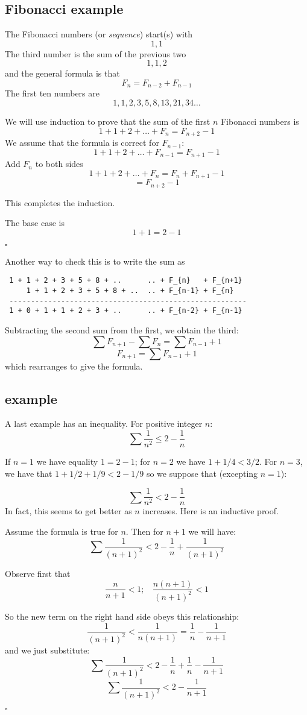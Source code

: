 \documentclass[11pt, oneside]{article}
\begin{document}
\subsection*{Fibonacci example}

The Fibonacci numbers (or \emph{sequence}) start(s) with
\[ 1, 1 \]
The third number is the sum of the previous two
\[ 1, 1, 2 \]
and the general formula is that
\[ F_n = F_{n-2} + F_{n-1} \]
The first ten numbers are
\[ 1, 1, 2, 3, 5, 8, 13, 21, 34 \dots \]

We will use induction to prove that the sum of the first $n$ Fibonacci numbers is
\[ 1 + 1 + 2 + \dots + F_n = F_{n+2} - 1 \]
We assume that the formula is correct for $F_{n - 1}$:
\[ 1 + 1 + 2 + \dots + F_{n-1} = F_{n+1} - 1 \]
Add $F_{n}$ to both sides
\[ 1 + 1 + 2 + \dots + F_{n} = F_{n} + F_{n+1} - 1 \]
\[ = F_{n+2} - 1 \]

This completes the induction.

The base case is 
\[ 1 + 1 = 2 - 1 \]

$\square$

Another way to check this is to write the sum as

\begin{verbatim}
 1 + 1 + 2 + 3 + 5 + 8 + ..      .. + F_{n}   + F_{n+1}
     1 + 1 + 2 + 3 + 5 + 8 + ..  .. + F_{n-1} + F_{n}
 -------------------------------------------------------
 1 + 0 + 1 + 1 + 2 + 3 + ..      .. + F_{n-2} + F_{n-1}
\end{verbatim}

Subtracting the second sum from the first, we obtain the third:
\[ \sum F_{n+1} - \sum F_n =  \sum F_{n-1} + 1  \]
\[ F_{n+1}  =  \sum F_{n-1} + 1  \]
which rearranges to give the formula.

\subsection*{example}

A last example has an inequality.  For positive integer $n$:
\[ \sum \frac{1}{n^2} \le 2 - \frac{1}{n} \]

If $n=1$ we have equality $1 = 2 - 1$; for $n=2$ we have $1 + 1/4 < 3/2$.  For $n = 3$, we have that $1 + 1/2 + 1/9 < 2 - 1/9$ so we suppose that (excepting $n=1$):

\[ \sum \frac{1}{n^2} < 2 - \frac{1}{n} \]
In fact, this seems to get better as $n$ increases.  Here is an inductive proof.

Assume the formula is true for $n$.  Then for $n+1$ we will have:
\[ \sum \frac{1}{(n+1)^2} < 2 - \frac{1}{n} + \frac{1}{(n+1)^2}  \]

Observe first that
\[ \frac{n}{n + 1} < 1; \ \ \ \  \frac{n(n+1)}{(n + 1)^2} < 1 \]

So the new term on the right hand side obeys this relationship:
\[ \frac{1}{(n + 1)^2} <  \frac{1}{n(n+1)} = \frac{1}{n} - \frac{1}{n + 1} \]
and we just substitute:
\[ \sum \frac{1}{(n+1)^2} < 2 - \frac{1}{n} + \frac{1}{n} - \frac{1}{n + 1} \]
\[ \sum \frac{1}{(n+1)^2} < 2 - \frac{1}{n + 1} \]

$\square$
\end{document}
